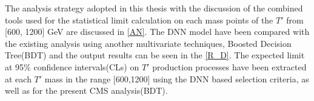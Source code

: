 The analysis strategy adopted in this thesis with the discussion of the combined tools used for the statistical limit calculation on each mass points of the $T'$ from [600, 1200] GeV are discussed in \autoref{AN}. The DNN model have been compared with the existing analysis using another multivariate techniques, Boosted Decision Tree(BDT) and the output results can be seen in the \autoref{R_D}. The expected limit at 95\% confidence intervals(CLs) on $T'$ production processes have been extracted at each $T'$ mass in the range [600,1200] using the DNN based selection criteria, as well as for the present CMS analysis(BDT).
















    









